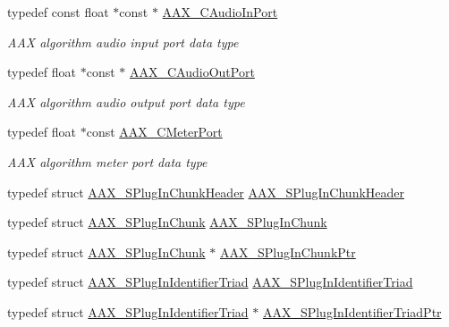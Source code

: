 \begin{DoxyCompactItemize}
\item 
typedef const float $\ast$const  $\ast$ \mbox{\hyperlink{a00392_a901605fce9f6c52b770f95916a5db4cf}{A\+A\+X\+\_\+\+C\+Audio\+In\+Port}}
\begin{DoxyCompactList}\small\item\em A\+AX algorithm audio input port data type \end{DoxyCompactList}\item 
typedef float $\ast$const  $\ast$ \mbox{\hyperlink{a00392_a650727644637144afc13344e7996c947}{A\+A\+X\+\_\+\+C\+Audio\+Out\+Port}}
\begin{DoxyCompactList}\small\item\em A\+AX algorithm audio output port data type \end{DoxyCompactList}\item 
typedef float $\ast$const \mbox{\hyperlink{a00392_aa6f40c5c3f36ede060fca61535ea8464}{A\+A\+X\+\_\+\+C\+Meter\+Port}}
\begin{DoxyCompactList}\small\item\em A\+AX algorithm meter port data type \end{DoxyCompactList}\item 
typedef struct \mbox{\hyperlink{a01417}{A\+A\+X\+\_\+\+S\+Plug\+In\+Chunk\+Header}} \mbox{\hyperlink{a00392_a5a7e5322afe0c3b98da933557ae0cbba}{A\+A\+X\+\_\+\+S\+Plug\+In\+Chunk\+Header}}
\item 
typedef struct \mbox{\hyperlink{a01421}{A\+A\+X\+\_\+\+S\+Plug\+In\+Chunk}} \mbox{\hyperlink{a00392_af52a5fe2ae79f803234d089889b7e481}{A\+A\+X\+\_\+\+S\+Plug\+In\+Chunk}}
\item 
typedef struct \mbox{\hyperlink{a01421}{A\+A\+X\+\_\+\+S\+Plug\+In\+Chunk}} $\ast$ \mbox{\hyperlink{a00392_ab215ba217e7d757be9ef167dfd8fa23a}{A\+A\+X\+\_\+\+S\+Plug\+In\+Chunk\+Ptr}}
\item 
typedef struct \mbox{\hyperlink{a01425}{A\+A\+X\+\_\+\+S\+Plug\+In\+Identifier\+Triad}} \mbox{\hyperlink{a00392_aa20951c2f27c7f5ff8ea4f92a893e29c}{A\+A\+X\+\_\+\+S\+Plug\+In\+Identifier\+Triad}}
\item 
typedef struct \mbox{\hyperlink{a01425}{A\+A\+X\+\_\+\+S\+Plug\+In\+Identifier\+Triad}} $\ast$ \mbox{\hyperlink{a00392_af0e64ac48db3c92acf98646b97a69f88}{A\+A\+X\+\_\+\+S\+Plug\+In\+Identifier\+Triad\+Ptr}}
\end{DoxyCompactItemize}
